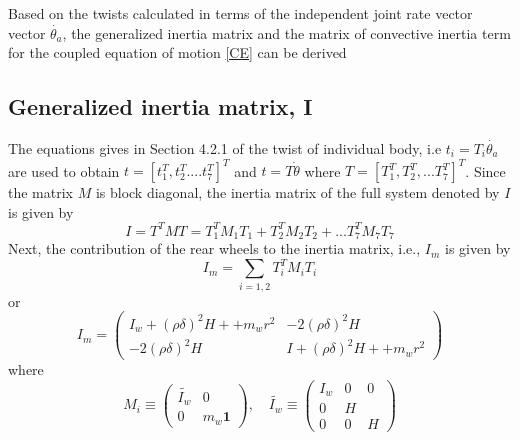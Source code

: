 Based on the twists calculated in terms of the independent joint rate vector vector $\dot{\theta_a}$,  the generalized inertia matrix and the matrix of convective inertia term for the coupled equation of motion \ref{CE} can be derived 
\subsection{Generalized inertia matrix, I}
\label{sec:GIM}
 The equations gives in Section 4.2.1 of the twist of individual body, i.e $t_i=T_i\dot{\theta_a}$ are used to obtain   $t=[t_1^T, t_2^T....t_7^T]^T$ and $t=T\dot\theta$ where  $T=[T_1^T, T_2^T,... T_7^T]^T$. Since the matrix $M$ is block diagonal, the inertia matrix of the full system  denoted by $I$ is given by
\begin{equation}
I=T^TMT=T_1^TM_1T_1+T_2^TM_2T_2+...T_7^TM_7T_7
\end{equation}
Next, the contribution of the rear wheels  to the inertia matrix, i.e., $I_m$ is given by  \[ I_m=\sum_{i=1,2}T_i^TM_iT_i\] or
\begin{equation}
\label{eqn:I_wheel}
I_m=\begin{pmatrix}
I_w+(\rho\delta)^2H++m_wr^2 & -2(\rho\delta)^2H
\\
-2(\rho\delta)^2H &I+(\rho\delta)^2H++m_wr^2
\end{pmatrix} 
\end{equation}
where 
\begin{equation}
\label{eqn:wheelInertiaMatrix}
M_i \equiv\begin{pmatrix}
\tilde{I_w} &0\\0 & m_w\mathbf{1}
\end{pmatrix} , \quad\tilde{I_w}\equiv\begin{pmatrix}
I_w&0&0\\0&H&\\0&0&H
\end{pmatrix}
\end{equation} 

